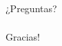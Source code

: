 \documentclass{beamer}
\begin{document}
\begin{frame}
\frametitle{}
\vfill
\centering
	¿Preguntas?
\vfill
\end{frame}





\begin{frame}
\frametitle{}
\vfill
\centering
    Gracias!
\vfill
\end{frame}
\end{document}

